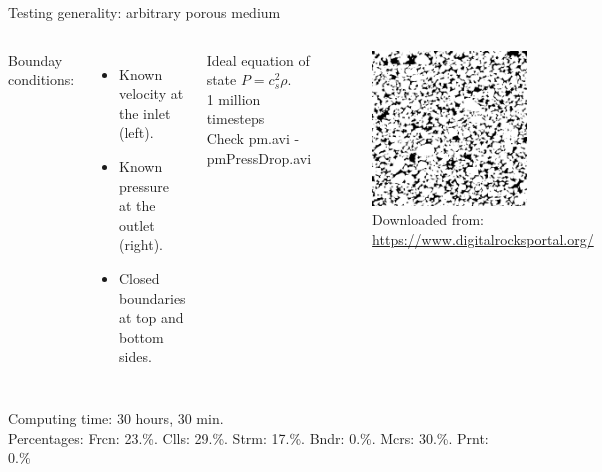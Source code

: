 \documentclass{beamer}
\begin{document}
	\begin{frame}{Testing generality: arbitrary porous medium}
		\begin{columns}
			Bounday conditions:
			\begin{itemize}
				\item Known velocity at the inlet (left).
				\item Known pressure at the outlet (right).
				\item Closed boundaries at top and bottom sides. 
			\end{itemize}
			
			Ideal equation of state $P = c^2_s \rho$.\\
			
			1 million timesteps \\
			Check pm.avi - pmPressDrop.avi
			\begin{figure}
				\centering
				\includegraphics[width=0.7\textwidth]{pics/porousMedia.jpg}
				\caption[]{{\small Downloaded from: \href{https://www.digitalrocksportal.org/}{https://www.digitalrocksportal.org/}}}   
			\end{figure}
		\end{columns}
		Computing time: 30 hours, 30 min. \\Percentages: Frcn: 23.\%. Clls: 29.\%. Strm: 17.\%. Bndr:  0.\%. Mcrs: 30.\%. Prnt:  0.\%
		
	\end{frame}
\end{document}
